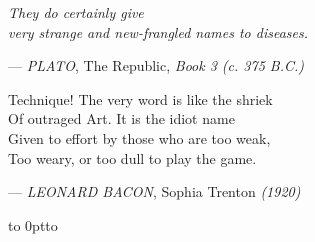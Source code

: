 \documentclass{article}
\def\CR{\\{}}
\begin{document}
\smallskip
\begin{flushright}
      \sffamily\itshape\small\parskip=1mm
      They do certainly give\CR
      very strange and new-frangled names to diseases.\par
      --- \emph{PLATO}, The Republic, \emph{Book 3 (c\@. 375 B.C.)}\par
      \smallskip
      Technique! The very word is like the shriek\CR
      Of outraged Art. It is the idiot name\CR
      Given to effort by those who are too weak,\CR
      Too weary, or too dull to play the game.\par
      --- \emph{LEONARD BACON}, Sophia Trenton \emph{(1920)}
\end{flushright}

\medskip\vtop to 0pt{\hbox{\kern-2.4cm\hbox to }}
\end{document}

